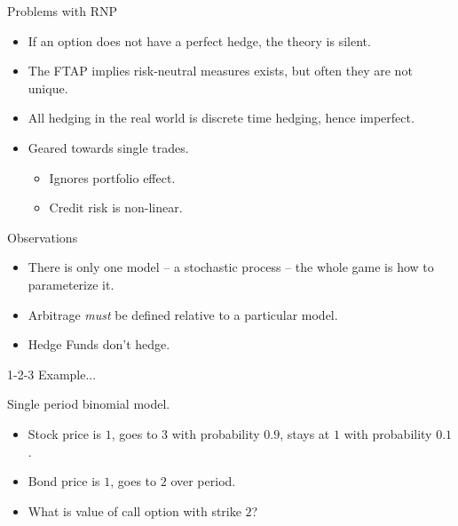 \documentclass[pdf,colorBG,slideColor,blends]{prosper}
\begin{document}
\begin{slide}{Problems with RNP}

\begin{itemize}

\item If an option does not have a perfect hedge, the theory
is silent.

\item The FTAP implies risk-neutral measures exists, but often
they are not unique.

\item All hedging in the real world is discrete time hedging, hence
imperfect.

\item Geared towards single trades.
\begin{itemize}
\item Ignores portfolio effect.
\item Credit risk is non-linear.
\end{itemize}

\end{itemize}

\end{slide}

\begin{slide}{Observations}

\begin{itemize}

\item There is only one model -- a stochastic process -- the whole
game is how to parameterize it.

\item Arbitrage {\em must} be defined relative to a particular model.

\item Hedge Funds don't hedge.

\end{itemize}

\end{slide}

\begin{slide}{1-2-3 Example{...}}

Single period binomial model.

\begin{itemize}

\item Stock price is $1$, goes to $3$ with probability $0.9$, stays at
$1$ with probability $0.1$.

\item Bond price is $1$, goes to $2$ over period.

\item What is value of call option with strike $2$?

\end{itemize}

\end{slide}
\end{document}
